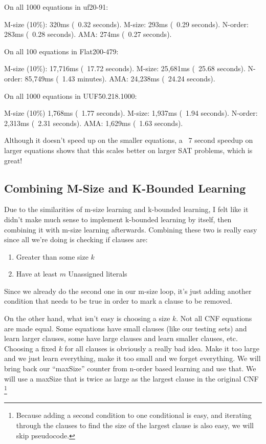 \begin{FVerbatim}
On all 1000 equations in uf20-91:

M-size (10\%):  320ms (~0.32 seconds).
M-size:         293ms (~0.29 seconds).
N-order:        283ms (~0.28 seconds).
AMA:            274ms (~0.27 seconds).

On all 100 equations in Flat200-479:

M-size (10\%):  17,716ms (~17.72 seconds).
M-size:         25,681ms (~25.68 seconds).
N-order:        85,749ms (~1.43 minutes).
AMA:            24,238ms (~24.24 seconds).

On all 1000 equations in UUF50.218.1000:

M-size (10\%)   1,768ms (~1.77 seconds).
M-size:         1,937ms (~1.94 seconds).
N-order:        2,313ms (~2.31 seconds).
AMA:            1,629ms (~1.63 seconds).
\end{FVerbatim}
\noindent
Although it doesn't speed up on the smaller equations, a ~7 second speedup on larger 
equations shows that this scales better on larger SAT problems, which is great!

\subsection{Combining M-Size and K-Bounded Learning}

Due to the similarities of m-size learning and k-bounded learning, I felt like it 
didn't make much sense to implement k-bounded learning by itself, then combining it 
with m-size learning afterwards. Combining these two is really easy since all we're 
doing is checking if clauses are:
\begin{enumerate}
    \item Greater than some size $k$
    \item Have at least $m$ Unassigned literals
\end{enumerate}
Since we already do the second one in our m-size loop, it's just adding another condition
that needs to be true in order to mark a clause to be removed.

On the other hand, what isn't easy is choosing a size $k$. Not all CNF equations are 
made equal. Some equations have small clauses (like our testing sets) and learn larger 
clauses, some have large clauses and learn smaller clauses, etc. Choosing a fixed $k$ for 
all clauses is obviously a really bad idea. Make it too large and we just learn everything, 
make it too small and we forget everything. We will bring back our ``maxSize'' counter 
from n-order based learning and use that. We will use a maxSize that is twice as large as 
the largest clause in the original CNF
\footnote{Because adding a second condition to one conditional is easy, and iterating through 
the clauses to find the size of the largest clause is also easy, we will skip pseudocode.}

